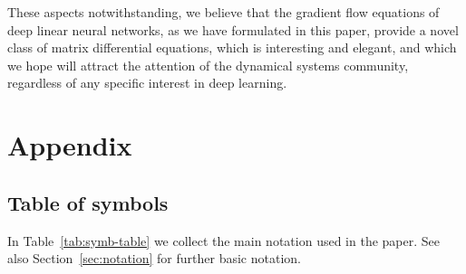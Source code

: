 \documentclass{article}
\newcommand{\1}{\mathds{1}}
\begin{document}
These aspects notwithstanding, we believe that the gradient flow equations of deep linear neural networks, as we have formulated in this paper, provide a novel class of matrix differential equations, which is interesting and elegant, and which we hope will attract the attention of the dynamical systems community, regardless of any specific interest in deep learning.

\appendix

\section{Appendix}


\subsection{Table of symbols}
\label{sec:symb-table}

In Table~\ref{tab:symb-table} we collect the main notation used in the paper. See also Section~\ref{sec:notation} for further basic notation. 
\end{document}
